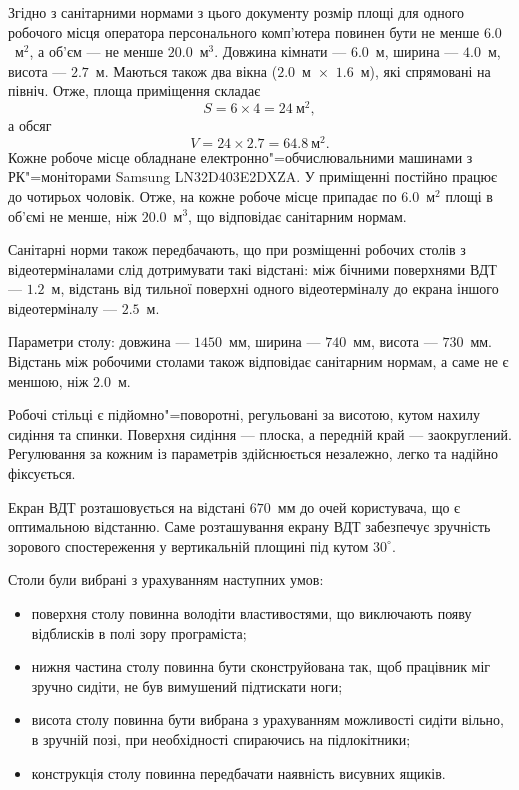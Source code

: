 \documentclass{diploma}
\begin{document}
    Згідно з санітарними нормами з цього документу розмір площі для одного
    робочого місця оператора персонального комп’ютера повинен бути не менше
    $6.0$~м$^2$, а об’єм --- не менше $20.0$~м$^3$.
    Довжина кімнати --- $6.0$~м, ширина --- $4.0$~м, висота ---
    $2.7$~м.
    Маються також два вікна ($2.0$~м~$\times$~$1.6$~м), які спрямовані
    на північ.
    Отже, площа приміщення складає
      \[
        S = 6 \times 4 = 24~\text{м}^2,
      \]
    а обсяг
      \[
        V = 24 \times 2.7 = 64.8~\text{м}^2.
      \]
    Кожне робоче місце обладнане електронно"=обчислювальними машинами з
    РК"=моніторами Samsung LN32D403E2DXZA.
    У приміщенні постійно працює до чотирьох чоловік.
    Отже, на кожне робоче місце припадає по $6.0$~м$^2$ площі в об’ємі не
    менше, ніж $20.0$~м$^3$, що відповідає санітарним нормам.

    Санітарні норми також передбачають, що при розміщенні робочих столів з
    відеотерміналами слід дотримувати такі відстані: між бічними поверхнями
    ВДТ --- $1.2$~м, відстань від тильної поверхні одного відеотерміналу до
    екрана іншого відеотерміналу --- $2.5$~м.

    Параметри столу: довжина --- $1450$~мм, ширина --- $740$~мм, висота ---
    $730$~мм.
    Відстань між робочими столами також відповідає санітарним нормам, а саме
    не є меншою, ніж $2.0$~м.

    Робочі стільці є підйомно"=поворотні, регульовані за висотою, кутом нахилу
    сидіння та спинки.
    Поверхня сидіння --- плоска, а передній край --- заокруглений.
    Регулювання за кожним із параметрів здійснюється незалежно, легко та
    надійно фіксується.

    Екран ВДТ розташовується на відстані $670$~мм до очей користувача, що
    є оптимальною відстанню.
    Саме розташування екрану ВДТ забезпечує зручність зорового спостереження у
    вертикальній площині під кутом $30^\circ$.

    Столи були вибрані з урахуванням наступних умов:
    \begin{itemize}
      \item поверхня столу повинна володіти властивостями, що виключають появу
        відблисків в полі зору програміста;
      \item нижня частина столу повинна бути сконструйована так, щоб працівник
        міг зручно сидіти, не був вимушений підтискати ноги;
      \item висота столу повинна бути вибрана з урахуванням можливості сидіти
        вільно, в зручній позі, при необхідності спираючись на підлокітники;
      \item конструкція столу повинна передбачати наявність висувних ящиків.
    \end{itemize}
\end{document}
